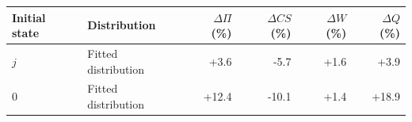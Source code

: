 \begin{tabular}{llrrrr}\toprule
Initial state & Distribution & $\Delta\Pi$ (\%) & $\Delta CS$ (\%) & $\Delta W$ (\%) & $\Delta Q$ (\%)\\\midrule
$j$ & Fitted distribution & +3.6 & -5.7 & +1.6 & +3.9 \\
$0$ & Fitted distribution & +12.4 & -10.1 & +1.4 & +18.9 \\
\bottomrule\end{tabular}
